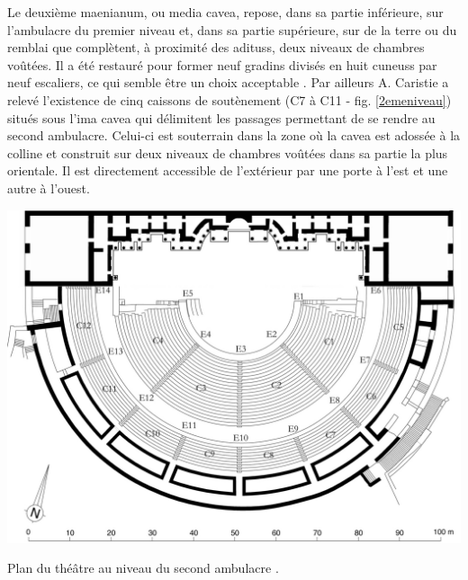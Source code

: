 		
		Le deuxième \gls{maenianum}, ou \gls{media cavea}, repose, dans sa partie inférieure, sur l'\gls{ambulacre} du premier niveau et, dans sa partie supérieure, sur de la terre ou du remblai que complètent, à proximité des \glspl{aditus}, deux niveaux de chambres voûtées. Il a été restauré pour former neuf gradins divisés en huit \glspl{cuneus} par neuf escaliers, ce qui semble être un choix acceptable \cite[p. 340]{orangeTxt}. Par ailleurs A. Caristie a relevé l'existence de cinq caissons de soutènement (C7 à C11 - fig. \ref{2emeniveau}) situés sous l'\gls{ima cavea} qui délimitent les passages permettant de se rendre au second \gls{ambulacre}. Celui-ci est souterrain dans la zone où la \gls{cavea} est adossée à la colline et construit sur deux niveaux de chambres voûtées dans sa partie la plus orientale. Il est directement accessible de l'extérieur par une porte à l'est et une autre à l'ouest.
		
	\begin{figureth}
		\includegraphics[width=\linewidth]{images/2emeniveau}
		\caption[Vue de dessus - 2ème niveau]{Plan du théâtre au niveau du second \gls{ambulacre} \footnotemark. }
		\label{2emeniveau}
	\end{figureth}		
		
